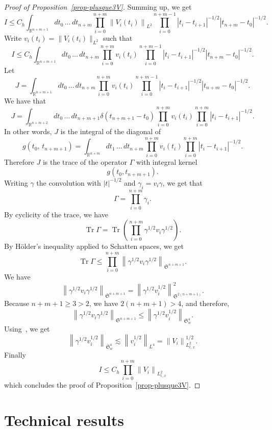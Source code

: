 \documentclass[AHL, Unicode, longabstracts,published]{cedram}
\newcommand{\R}{\mathbb{R}}
\DeclareMathOperator{\Tr}{Tr}
\newcommand{\frkS}{\mathfrak{S}}
\begin{document}
\begin{proof}[Proof of Proposition~\ref{prop-plusque3V}]
Summing up, we get
\[
I \leq C_h \int_{\R^{n+m+1}} dt_0\,\hdots\,dt_{n+m} \prod_{i=0}^{n+m} \left\|V_i(t_i)\right\|_{L^2} \prod_{i=0}^{n+m-1}\left|t_i - t_{i+1}\right|^{-1/2}\left|t_{n+m} - t_0\right|^{-1/2}.
\]
Write $v_i(t_i) = \|V_i(t_i)\|_{L^2}$ such that
\[
I \leq C_h \int_{\R^{n+m+1}} dt_0\,\hdots\,dt_{n+m} \prod_{i=0}^{n+m} v_i(t_i) \prod_{i=0}^{n+m-1}\left|t_i - t_{i+1}\right|^{-1/2}\left|t_{n+m} - t_0\right|^{-1/2}.
\]
Let
\[
J = \int_{\R^{n+m+1}} dt_0\,\hdots\,dt_{n+m} \prod_{i=0}^{n+m} v_i(t_i) \prod_{i=0}^{n+m-1}\left|t_i - t_{i+1}\right|^{-1/2}\left|t_{n+m} - t_0\right|^{-1/2}.
\]
We have that
\[
J = \int_{\R^{n+m+2}} dt_0\,\hdots\,dt_{n+m+1} \delta\left(t_{n+m+1} - t_0\right)\prod_{i=0}^{n+m} v_i(t_i) \prod_{i=0}^{n+m}\left|t_i - t_{i+1}\right|^{-1/2}.
\]
In other words, $J$ is the integral of the diagonal of
\[
g\left(t_0,\,t_{n+m+1}\right) = \int_{\R^{n+m}} dt_1 \,\hdots\,dt_{n+m} \prod_{i=0}^{n+m} v_i(t_i) \prod_{i=0}^{n+m}\left|t_i - t_{i+1}\right|^{-1/2}.
\]
Therefore $J$ is the trace of the operator $\Gamma$ with integral kernel
\[
g(t_0,t_{n+m+1}).
\]
Writing $\gamma$ the convolution with $|t|^{-1/2}$ and $\gamma_i = v_i \gamma$, we get that
\[
\Gamma = \prod_{i=0}^{n+m} \gamma_i.
\]
By cyclicity of the trace, we have
\[
\Tr\Gamma = \Tr \left(\prod_{i=0}^{n+m} \gamma^{1/2} v_i \gamma^{1/2} \right).
\]
By H\"older's inequality applied to Schatten spaces, we get
\[
\Tr\Gamma \leq \prod_{i=0}^{n+m} \left\|\gamma^{1/2} v_i \gamma^{1/2}\right\|_{\frkS^{n+m+1}}.
\]
We have
\[
\left\|\gamma^{1/2} v_i \gamma^{1/2}\right\|_{\frkS^{n+m+1}}= \left\|\gamma^{1/2} v_i^{1/2}\right\|_{\frkS^{2\left(n+m+1\right)}}^2.
\]
Because $n+m+1 \geq 3> 2$, we have $2(n+m+1) > 4$, and therefore,
\[
\left\|\gamma^{1/2} v_i \gamma^{1/2}\right\|_{\frkS^{n+m+1}}\leq \left\|\gamma^{1/2} v_i^{1/2} \right\|_{\frkS_w^{4}}.
\]
Using~\cite[Cwikel's inequality as in p~17]{FLLS}, we get
\[
\left\|\gamma^{1/2} v_i^{1/2} \right\|_{\frkS_w^{4}}\lesssim \left\|v_i^{1/2}\right\|_{L^4} = \left\|V_i\right\|_{L^2_{t,\,x}}^{1/2}.
\]
Finally
\[
I \leq C_h \prod_{i=0}^{n+m} \left\|V_i\right\|_{L^2_{t,\,x}}
\]
which concludes the proof of Proposition~\ref{prop-plusque3V}.
\end{proof}


\section{Technical results}\label{sec:tech}
\end{document}
